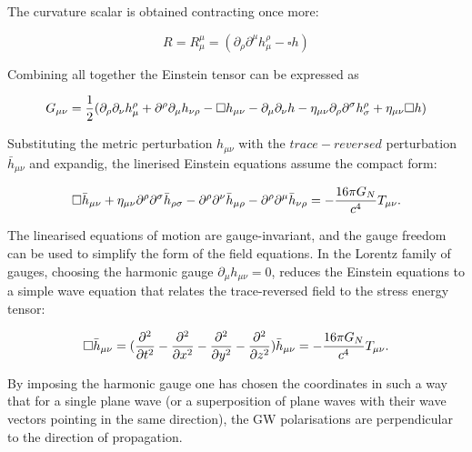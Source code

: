 \documentclass[binding=0.6cm, LaM]{sapthesis}
\begin{document}
	The curvature scalar is obtained contracting once more:

		\begin{equation}
		R = R^{\mu}_{\mu} = (\partial_{\rho}\partial^{\mu}h^{\rho}_{\mu} - \square h)
		\end{equation}

	Combining all together the Einstein tensor can be expressed as
	
		\begin{equation}
		G_{\mu\nu} = {1 \over 2}(\partial_{\rho}\partial_{\nu}h^{\rho}_{\mu} + \partial^{\rho}\partial_{\mu}h_{\nu\rho} - \square h_{\mu\nu} - \partial_{\mu}\partial_{\nu}h - \eta_{\mu\nu}\partial_{\rho}\partial^{\sigma}h^{\rho}_{\sigma} + \eta_{\mu\nu}\square h)
		\end{equation}

	Substituting the metric perturbation $h_{\mu\nu}$  with the $trace-reversed$ perturbation ${\bar h}_{\mu\nu}$ and expandig, 
	the linerised Einstein equations assume the  compact form:

		\begin{equation}
		\square {\bar h}_{\mu\nu} + \eta_{\mu\nu}{\partial}^{\rho}{\partial}^{\sigma}{\bar h}_{\rho\sigma} - {\partial}^{\rho}{\partial}^{\nu}{\bar h}_{\mu\rho} - {\partial}^{\rho}{\partial}^{\mu}{\bar h}_{\nu\rho} = - {{16\pi G_{N}} \over {c^4}}T_{\mu\nu}.
		\end{equation}

	The linearised equations of motion are gauge-invariant, and the gauge freedom can
 	be used to simplify the form of the field equations.
 	In the Lorentz family of gauges, choosing the harmonic gauge $ \partial_{\mu}h_{\mu\nu} = 0 $, 
	reduces the Einstein equations to a simple wave equation that relates the trace-reversed field
 	to the stress energy tensor:

		\begin{equation}
		\square {\bar h}_{\mu\nu} =({\partial^2 \over {\partial t^2} } - {\partial^2 \over {\partial x^2}}  - {\partial^2 \over {\partial y^2}}  -  {\partial^2 \over {\partial z^2}}) {\bar h}_{\mu\nu} = -{{16\pi G_{N}} \over {c^4}}T_{\mu\nu}. 
		\end{equation}

	By imposing the harmonic gauge one has chosen the coordinates in such a way that for a single plane wave 
	(or a superposition of plane waves with their wave vectors pointing in the same direction),
	the GW polarisations are perpendicular to the direction of propagation.
\end{document}

